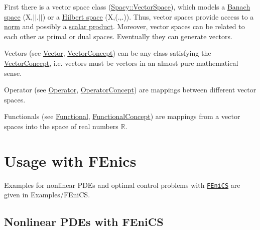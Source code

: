 \begin{DoxyItemize}
\item First there is a vector space class (\hyperlink{classSpacy_1_1VectorSpace}{Spacy\+::\+Vector\+Space}), which models a \hyperlink{group__SpacyGroup_gabfc17f845736365ee79be8ce68d50b27_gabfc17f845736365ee79be8ce68d50b27}{Banach space}  (X,$\vert$$\vert$.$\vert$$\vert$) or a \hyperlink{group__SpacyGroup_ga63c49d211bf214be1fb321440ed03aad_ga63c49d211bf214be1fb321440ed03aad}{Hilbert space}  (X,(.,.)). Thus, vector spaces provide access to a \hyperlink{group__SpacyGroup_gaf4f33b11d657c48566d961a013c92bd1_NormAnchor}{norm} and possibly a \hyperlink{group__SpacyGroup_ga9fe0b4de20da1ab1ca3d04a0f96343e1_ScalarProductAnchor}{scalar product}. Moreover, vector spaces can be related to each other as primal or dual spaces. Eventually they can generate vectors.
\item Vectors (see \hyperlink{group__SpacyGroup_gafc144d2730ef87a67e54f8cd750b1f54_VectorAnchor}{Vector}, \hyperlink{group__ConceptGroup_gad6958389d1fa2758a8a64a0a24c36004_VectorConceptAnchor}{Vector\+Concept}) can be any class satisfying the \hyperlink{group__ConceptGroup_gad6958389d1fa2758a8a64a0a24c36004_VectorConceptAnchor}{Vector\+Concept}, i.\+e. vectors must be vectors in an almost pure mathematical sense.
\item Operator (see \hyperlink{group__SpacyGroup_ga3f89622eba80cf840b2a7102f1303455_OperatorAnchor}{Operator}, \hyperlink{group__ConceptGroup_ga7d984281b647a6d8e4c0a7ea5faeb90e_OperatorConceptAnchor}{Operator\+Concept}) are mappings between different vector spaces.
\item Functionals (see \hyperlink{group__SpacyGroup_ga673218f603c93790864aef12c89d3a35_FunctionalAnchor}{Functional}, \hyperlink{group__ConceptGroup_ga5273b50bd3e8c9a3f5a1e6b5f170836d_FunctionalConceptAnchor}{Functional\+Concept}) are mappings from a vector spaces into the space of real numbers $ \mathbb{R} $.
\end{DoxyItemize}\hypertarget{index_sec_usage_fenics}{}\section{Usage with F\+Enics}\label{index_sec_usage_fenics}
Examples for nonlinear P\+D\+Es and optimal control problems with \href{http://www.fenicsproject.org}{\tt F\+Eni\+C\+S} are given in Examples/\+F\+Eni\+C\+S.\hypertarget{index_sub_usage_fenics_pde}{}\subsection{Nonlinear P\+D\+Es with F\+Eni\+C\+S}\label{index_sub_usage_fenics_pde}
